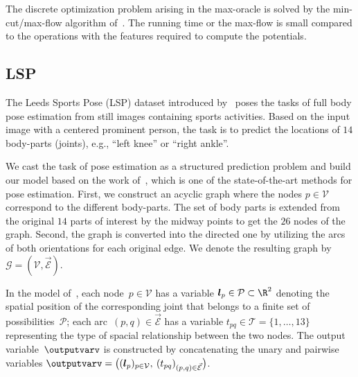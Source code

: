 \documentclass{article}
\begin{document}
The discrete optimization problem arising in the max-oracle is solved by the min-cut/max-flow algorithm of~\citet{boykov2004graphcut}.
The running time or the max-flow is small compared to the operations with the features required to compute the potentials.

\subsection{LSP}
The Leeds Sports Pose (LSP) dataset introduced by~\cite{Johnson10} poses the tasks of full body pose estimation from still images containing sports activities.
Based on the input image with a centered prominent person, the task is to predict the locations of $14$ body-parts (joints), e.g., ``left knee'' or ``right ankle''.

We cast the task of pose estimation as a structured prediction problem and build our model based on the work of~\citet{Chen_NIPS14}, which is one of the state-of-the-art methods for pose estimation.
First, we construct an acyclic graph  where the nodes $p\in\mathcal{V}$ correspond to the different body-parts. The set of body parts is extended from the original $14$ parts of interest by the midway points to get the $26$ nodes of the graph. Second, the graph is converted into the directed one by utilizing the arcs of both orientations for each original edge. We denote the resulting graph by $\mathcal{G}=(\mathcal{V},\vec{\mathcal{E}})$.

In the model of~\citet{Chen_NIPS14}, each node~$p\in\mathcal{V}$ has a variable $\bm{l}_p \in \mathcal{P} \subset \R^2$ denoting the spatial position of the corresponding joint that belongs to a finite set of possibilities~$\mathcal{P}$; each arc~$(p,q) \in \vec{\mathcal{E}}$ has a variable $t_{pq} \in \mathcal{T} = \{1,\dots,13\}$ representing the type of spacial relationship between the two nodes. The output variable~$\outputvarv$ is constructed by concatenating the unary and pairwise variables $\outputvarv = \bigl( (\bm{l}_p)_{p \in \mathcal{V}}, \: (t_{pq})_{(p,q) \in \vec{\mathcal{E}}} \bigr)$.
\end{document}
